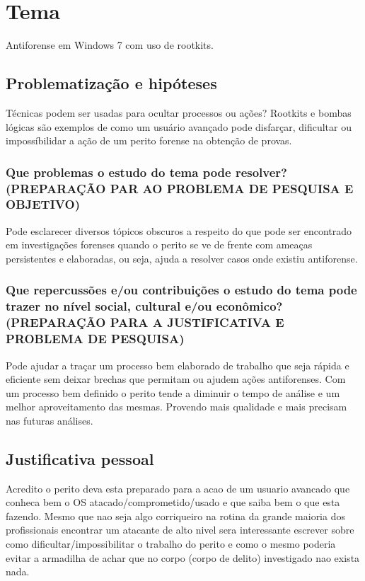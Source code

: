 \chapter*{Tema}

Antiforense em Windows 7 com uso de rootkits.

\section{Problematização e hipóteses}

Técnicas podem ser usadas para ocultar processos ou ações? Rootkits e bombas lógicas são exemplos de como um usuário avançado pode disfarçar, dificultar ou impossíbilidar a ação de um perito forense na obtenção de provas.

\subsection{Que problemas o estudo do tema pode resolver? (PREPARAÇÃO PAR AO PROBLEMA DE PESQUISA E OBJETIVO)}

Pode esclarecer diversos tópicos obscuros a respeito do que pode ser encontrado em investigações forenses quando o perito se ve de frente com ameaças persistentes e elaboradas, ou seja, ajuda a resolver casos onde existiu antiforense.

\subsection{Que repercussões e/ou contribuições o estudo do tema pode trazer no nível social, cultural e/ou econômico?(PREPARAÇÃO PARA A JUSTIFICATIVA E PROBLEMA DE PESQUISA)}

Pode ajudar a traçar um processo bem elaborado de trabalho que seja rápida e eficiente sem deixar brechas que permitam ou ajudem ações antiforenses. Com um processo bem definido o perito tende a diminuir o tempo de análise e um melhor aproveitamento das mesmas. Provendo mais qualidade e mais precisam nas futuras análises.

\section{Justificativa pessoal}
Acredito o perito deva esta preparado para a acao de um usuario avancado que conheca bem o OS atacado/comprometido/usado e que saiba bem o que esta fazendo. Mesmo que nao seja algo corriqueiro na rotina da grande maioria dos profissionais encontrar um atacante de alto nivel sera interessante escrever sobre como dificultar/impossibilitar o trabalho do perito e como o mesmo poderia evitar a armadilha de achar que no corpo (corpo de delito) investigado nao exista nada.

